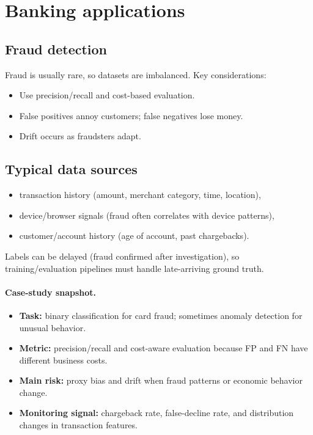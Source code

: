 \documentclass[11pt]{article}
\begin{document}
\section{Banking applications}
\subsection{Fraud detection}
Fraud is usually rare, so datasets are imbalanced. Key considerations:
\begin{itemize}[leftmargin=*]
  \item Use precision/recall and cost-based evaluation.
  \item False positives annoy customers; false negatives lose money.
  \item Drift occurs as fraudsters adapt.
\end{itemize}

\subsection{Typical data sources}
\begin{itemize}[leftmargin=*]
  \item transaction history (amount, merchant category, time, location),
  \item device/browser signals (fraud often correlates with device patterns),
  \item customer/account history (age of account, past chargebacks).
\end{itemize}
Labels can be delayed (fraud confirmed after investigation), so training/evaluation pipelines must handle late-arriving ground truth.

\paragraph{Case-study snapshot.}
\begin{itemize}[leftmargin=*]
  \item \textbf{Task:} binary classification for card fraud; sometimes anomaly detection for unusual behavior.
  \item \textbf{Metric:} precision/recall and cost-aware evaluation because FP and FN have different business costs.
  \item \textbf{Main risk:} proxy bias and drift when fraud patterns or economic behavior change.
  \item \textbf{Monitoring signal:} chargeback rate, false-decline rate, and distribution changes in transaction features.
\end{itemize}
\end{document}
